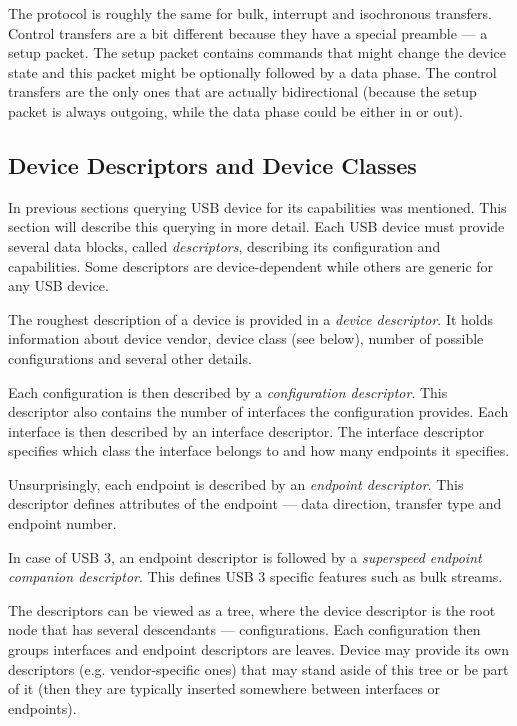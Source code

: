 The protocol is roughly the same for bulk, interrupt and isochronous
transfers. Control transfers are a bit different because they have a special
preamble — a setup packet. The setup packet contains commands that might
change the device state and this packet might be optionally followed by a data
phase. The control transfers are the only ones that are actually bidirectional
(because the setup packet is always outgoing, while the data phase could be
either in or out).

\subsection{Device Descriptors and Device Classes}

In previous sections querying USB device for its capabilities was mentioned.
This section will describe this querying in more detail. Each USB device must
provide several data blocks, called \textit{descriptors}, describing its
configuration and capabilities. Some descriptors are device-dependent while
others are generic for any USB device.

The roughest description of a device is provided in a \textit{device
descriptor}. It holds information about device vendor, device class (see
below), number of possible configurations and several other details.

Each configuration is then described by a \textit{configuration descriptor}.
This descriptor also contains the number of interfaces the configuration
provides. Each interface is then described by an interface descriptor. The
interface descriptor specifies which class the interface belongs to and how
many endpoints it specifies.

Unsurprisingly, each endpoint is described by an \textit{endpoint descriptor}.
This descriptor defines attributes of the endpoint — data direction, transfer
type and endpoint number.

In case of USB 3, an endpoint descriptor is followed by a \textit{superspeed
endpoint companion descriptor}. This defines USB 3 specific features such as
bulk streams.

The descriptors can be viewed as a tree, where the device descriptor is the
root node that has several descendants — configurations. Each configuration
then groups interfaces and endpoint descriptors are leaves. Device may provide
its own descriptors (e.g. vendor-specific ones) that may stand aside of this
tree or be part of it (then they are typically inserted somewhere between
interfaces or endpoints).

